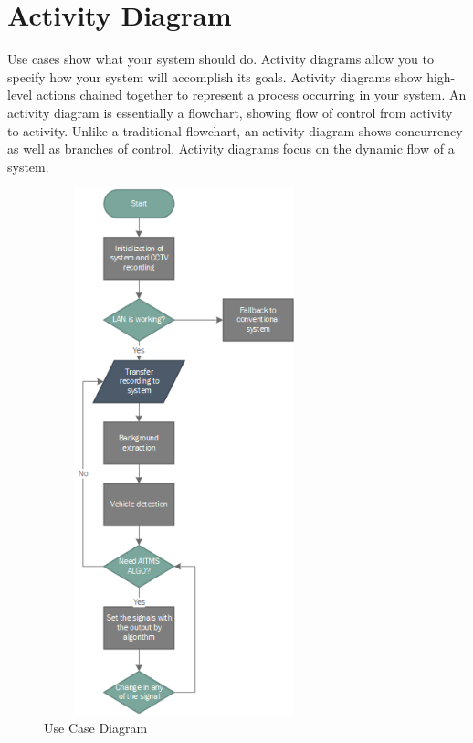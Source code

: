 \documentclass[openany,12pt]{report}
\begin{document}
	\section{Activity Diagram}
	\hspace*{0.5in}Use cases show what your system should do. Activity diagrams allow you to specify how your system will accomplish its goals. Activity diagrams show high-level actions chained together to represent a process occurring in your system. An activity diagram is essentially a flowchart, showing flow of control from activity to activity. Unlike a traditional flowchart, an activity diagram shows concurrency as well as branches of control. Activity diagrams focus on the dynamic flow of a system.\\

	\begin{figure}[H]
		\centering
		\includegraphics[width=3.2in,height=6in]{./Diagrams/PNG/flow}
		\caption{Use Case Diagram}
	\end{figure}
	\newpage
	
\end{document}
